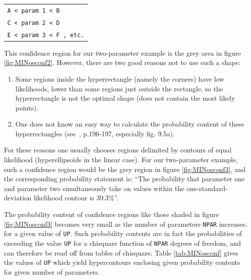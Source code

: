 \begin{center}
\begin{tabular}{>{\tt}l}
A < param 1 < B \\
C < param 2 < D \\
E < param 3 < F , {\rm etc.}
\end{tabular}
\end{center}


This confidence region for our two-parameter example is the 
grey area in figure \ref{fig:MINosconf2}. 
However, there are two good reasons 
not to use such a shape:
 
\begin{enumerate}
\item Some regions inside the hyperrectangle (namely the corners) have 
      low likelihoods, lower than some regions just outside the rectangle, 
      so the hyperrectangle is not the optimal shape (does not contain the 
      most likely points).
\item One does not know an easy way to calculate the probability 
      content of these hyperrectangles (see~\cite{bib-EADIE}, p.196-197, 
      especially fig. 9.5a).
\end{enumerate} 

For these reasons one usually chooses regions delimited by contours 
of equal likelihood (hyperellipsoids in the linear case). For our 
two-parameter example, such a confidence region would be the grey
region in figure \ref{fig:MINosconf3}, and the corresponding probability 
statement is: ``The probability that parameter one and parameter two 
simultaneously take on values within the one-standard-deviation likelihood 
contour is 39.3\%''.
 
The probability content of confidence regions like those shaded in 
figure \ref{fig:MINosconf3} becomes very small as the number of parameters 
\texttt{NPAR} increases, for a given value of \texttt{UP}. 
Such probability contents are in 
fact the probabilities of exceeding the value \texttt{UP} for a chisquare 
function of \texttt{NPAR} degrees of freedom, and can therefore be read off 
from tables of chisquare. 
Table \ref{tab:MINosconf} gives the values of \texttt{UP} which 
yield hypercontours enclosing given probability contents for given 
number of parameters.


